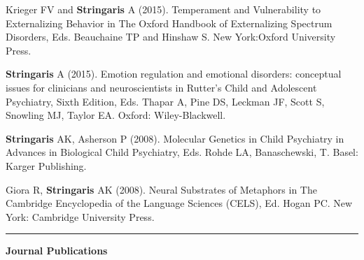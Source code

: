 \documentclass[
]{article}
\begin{document}
Krieger FV and \textbf{Stringaris} A (2015). Temperament and
Vulnerability to Externalizing Behavior in The Oxford Handbook of
Externalizing Spectrum Disorders, Eds. Beauchaine TP and Hinshaw S. New
York:Oxford University Press.

\textbf{Stringaris} A (2015). Emotion regulation and emotional
disorders: conceptual issues for clinicians and neuroscientists in
Rutter's Child and Adolescent Psychiatry, Sixth Edition, Eds. Thapar A,
Pine DS, Leckman JF, Scott S, Snowling MJ, Taylor EA. Oxford:
Wiley-Blackwell.

\textbf{Stringaris} AK, Asherson P (2008). Molecular Genetics in Child
Psychiatry in Advances in Biological Child Psychiatry, Eds. Rohde LA,
Banaschewski, T. Basel: Karger Publishing.

Giora R, \textbf{Stringaris} AK (2008). Neural Substrates of Metaphors
in The Cambridge Encyclopedia of the Language Sciences (CELS), Ed. Hogan
PC. New York: Cambridge University Press.

\begin{center}\rule{0.5\linewidth}{0.5pt}\end{center}

\textbf{Journal Publications}
\end{document}
